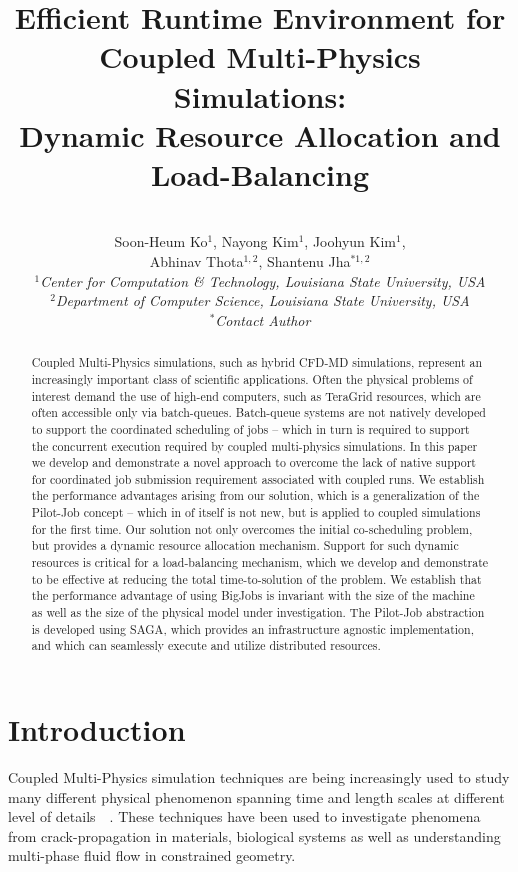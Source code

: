 \documentclass[conference,final]{IEEEtran}
\title{Efficient Runtime Environment for Coupled Multi-Physics Simulations: \\
Dynamic Resource Allocation and Load-Balancing}
\author{
 ~\\[-2em]
 Soon-Heum Ko$^{1}$, Nayong Kim$^{1}$, Joohyun Kim$^{1}$, \\ Abhinav Thota$^{1,2}$, Shantenu Jha$^{*1,2}$\\
 \small{\emph{$^{1}$Center for Computation \& Technology, Louisiana State University, USA}}\\
 \small{\emph{$^{2}$Department of Computer Science, Louisiana State University, USA}}\\
 \small{\emph{$^{*}$Contact Author}}\\
}
\newcommand{\up}{\vspace*{-1em}}
\begin{document}
\maketitle

\begin{abstract}
  Coupled Multi-Physics simulations, such as hybrid CFD-MD
  simulations, represent an increasingly important class of scientific
  applications.  Often the physical problems of interest demand the
  use of high-end computers, such as TeraGrid resources, which are
  often accessible only via batch-queues. Batch-queue systems are not
  natively developed to support the coordinated scheduling of jobs --
  which in turn is required to support the concurrent execution
  required by coupled multi-physics simulations. In this paper we
  develop and demonstrate a novel approach to overcome the lack of
  native support for coordinated job submission requirement associated
  with coupled runs. We establish the performance advantages arising
  from our solution, which is a generalization of the Pilot-Job
  concept -- which in of itself is not new, but is applied to coupled
  simulations for the first time.  Our solution not only overcomes the
  initial co-scheduling problem, but provides a dynamic resource
  allocation mechanism. Support for such dynamic resources is critical
  for a load-balancing mechanism, which we develop and demonstrate to
  be effective at reducing the total time-to-solution of the
  problem. We establish that the performance advantage of using
  BigJobs is invariant with the size of the machine as well as the
  size of the physical model under investigation.  The Pilot-Job
  abstraction is developed using SAGA, which provides an
  infrastructure agnostic implementation, and which can seamlessly
  execute and utilize distributed resources. 
\end{abstract}
\up\up


\section{Introduction}

Coupled Multi-Physics simulation techniques are being increasingly
used to study many different physical phenomenon spanning time and
length scales at different level of
details~\cite{Tai}~\cite{Watanabe}. These techniques have been used to
investigate phenomena from crack-propagation in materials, biological
systems as well as understanding multi-phase fluid flow in constrained
geometry.
\end{document}
